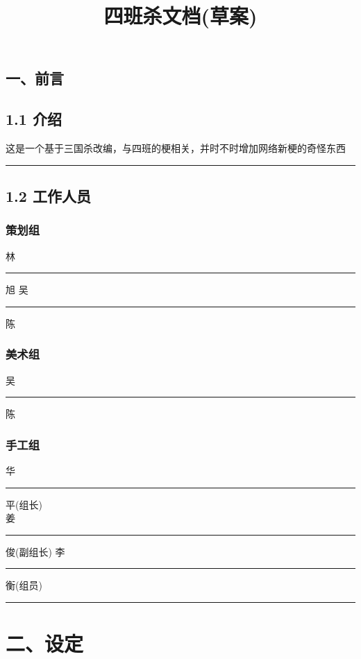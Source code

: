 \documentclass[UTF-8]{ctexart}
\title{四班杀文档(草案)}
\date{}
\begin{document}
\maketitle
\thispagestyle{empty}
\newpage

\begin{center}
\section*{一、前言}
\end{center}

\subsection*{1.1    介绍}
这是一个基于三国杀改编，与四班的梗相关，并时不时增加网络新梗的奇怪东西

{\noindent} \rule[-10pt]{33em}{0.05em}
\begin{center}
\subsection*{1.2    工作人员}

    \subsubsection*{策划组}
    林\rule[-2pt]{1em}{1em}旭 \hspace{1.0cm} 吴\rule[-2pt]{1em}{1em}陈
    \subsubsection*{美术组}
    吴\rule[-2pt]{1em}{1em}陈
    \subsubsection*{手工组}
    华\rule[-2pt]{1em}{1em}平(组长) \\ 姜\rule[-2pt]{1em}{1em}俊(副组长) \hspace{1.0cm} 李\rule[-2pt]{1em}{1em}衡(组员)

\end{center}
{\noindent} \rule[-10pt]{33em}{0.05em}

\newpage

\section*{二、设定}
\end{document}
